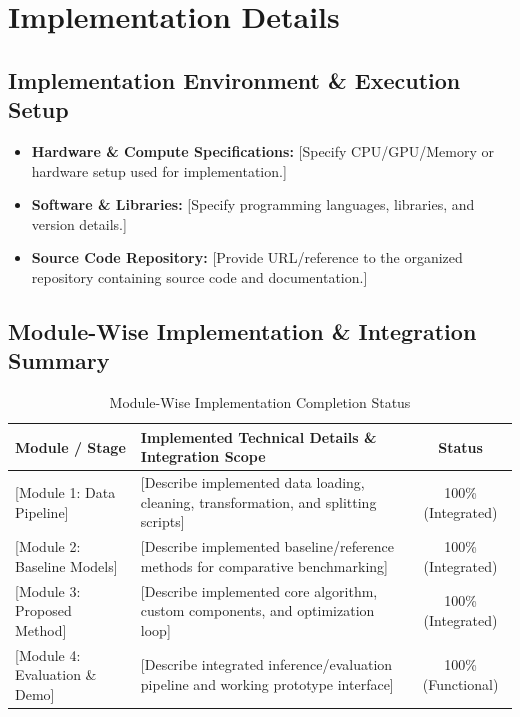 \documentclass[11pt, a4paper]{article}
\begin{document}
\section{Implementation Details}

\subsection{Implementation Environment \& Execution Setup}
\begin{itemize}[noitemsep, topsep=2pt]
    \item \textbf{Hardware \& Compute Specifications:} {[Specify CPU/GPU/Memory or hardware setup used for implementation.]}
    \item \textbf{Software \& Libraries:} {[Specify programming languages, libraries, and version details.]}
    \item \textbf{Source Code Repository:} {[Provide URL/reference to the organized repository containing source code and documentation.]}
\end{itemize}

\subsection{Module-Wise Implementation \& Integration Summary}
\begin{table}[H]
    \centering
    \footnotesize
    \renewcommand{\arraystretch}{1.25}
    \begin{tabular}{|p{3.5cm}|p{7.8cm}|c|}
        \hline
        \textbf{Module / Stage} & \textbf{Implemented Technical Details \& Integration Scope} & \textbf{Status} \\
        \hline
        {[Module 1: Data Pipeline]} & {[Describe implemented data loading, cleaning, transformation, and splitting scripts]} & 100\% (Integrated) \\
        \hline
        {[Module 2: Baseline Models]} & {[Describe implemented baseline/reference methods for comparative benchmarking]} & 100\% (Integrated) \\
        \hline
        {[Module 3: Proposed Method]} & {[Describe implemented core algorithm, custom components, and optimization loop]} & 100\% (Integrated) \\
        \hline
        {[Module 4: Evaluation \& Demo]} & {[Describe integrated inference/evaluation pipeline and working prototype interface]} & 100\% (Functional) \\
        \hline
    \end{tabular}
    \caption{Module-Wise Implementation Completion Status}
\end{table}
\end{document}
